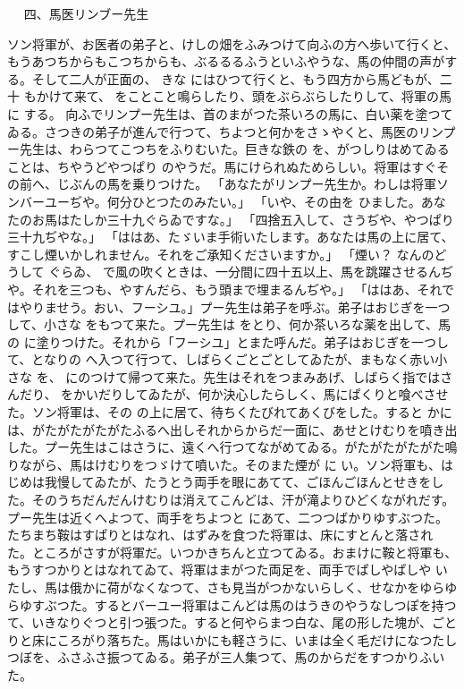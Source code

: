 \documentclass[a4paper,
tate,
book]
{jlreq}
\begin{document}
 
            四、馬医リンブー先生

  ソン将軍が、お医者の弟子と、けしの畑をふみつけて向ふの方へ歩いて行くと、もうあつちからもこつちからも、ぶるるるふうといふやうな、馬の仲間の声がする。そして二人が正面の、 きな にはひつて行くと、もう四方から馬どもが、二十 もかけて来て、 をことこと鳴らしたり、頭をぶらぶらしたりして、将軍の馬に する。
  向ふでリンプー先生は、首のまがつた茶いろの馬に、白い薬を塗つてゐる。さつきの弟子が進んで行つて、ちよつと何かをさゝやくと、馬医のリンプー先生は、わらつてこつちをふりむいた。巨きな鉄の を、がつしりはめてゐることは、ちやうどやつぱり のやうだ。馬にけられぬためらしい。将軍はすぐその前へ、じぶんの馬を乗りつけた。
「あなたがリンプー先生か。わしは将軍ソンバーユーぢや。何分ひとつたのみたい。」
「いや、その由を ひました。あなたのお馬はたしか三十九ぐらゐですな。」
「四捨五入して、さうぢや、やつぱり三十九ぢやな。」
「ははあ、たゞいま手術いたします。あなたは馬の上に居て、すこし煙いかしれません。それをご承知くださいますか。」
「煙い？  なんのどうして ぐらゐ、 で風の吹くときは、一分間に四十五以上、馬を跳躍させるんぢや。それを三つも、やすんだら、もう頭まで埋まるんぢや。」
「ははあ、それではやりませう。おい、フーシユ。」プー先生は弟子を呼ぶ。弟子はおじぎを一つして、小さな をもつて来た。プー先生は をとり、何か茶いろな薬を出して、馬の に塗りつけた。それから「フーシユ」とまた呼んだ。弟子はおじぎを一つして、となりの へ入つて行つて、しばらくごとごとしてゐたが、まもなく赤い小さな を、 にのつけて帰つて来た。先生はそれをつまみあげ、しばらく指ではさんだり、 をかいだりしてゐたが、何か決心したらしく、馬にぱくりと喰べさせた。ソン将軍は、その の上に居て、待ちくたびれてあくびをした。すると かに は、がたがたがたがたふるへ出しそれからからだ一面に、あせとけむりを噴き出した。プー先生はこはさうに、遠くへ行つてながめてゐる。がたがたがたがた鳴りながら、馬はけむりをつゞけて噴いた。そのまた煙が に い。ソン将軍も、はじめは我慢してゐたが、たうとう両手を眼にあてて、ごほんごほんとせきをした。そのうちだんだんけむりは消えてこんどは、汗が滝よりひどくながれだす。プー先生は近くへよつて、両手をちよつと にあて、二つつばかりゆすぶつた。
  たちまち鞍はすぱりとはなれ、はずみを食つた将軍は、床にすとんと落された。ところがさすが将軍だ。いつかきちんと立つてゐる。おまけに鞍と将軍も、もうすつかりとはなれてゐて、将軍はまがつた両足を、両手でぱしやぱしや いたし、馬は俄かに荷がなくなつて、さも見当がつかないらしく、せなかをゆらゆらゆすぶつた。するとバーユー将軍はこんどは馬のはうきのやうなしつぽを持つて、いきなりぐつと引つ張つた。すると何やらまつ白な、尾の形した塊が、ごとりと床にころがり落ちた。馬はいかにも軽さうに、いまは全く毛だけになつたしつぼを、ふさふさ振つてゐる。弟子が三人集つて、馬のからだをすつかりふいた。
\end{document}
